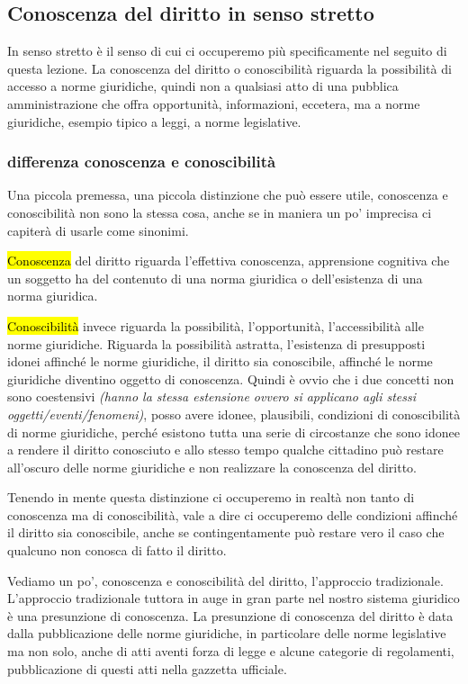 \subsection{Conoscenza del diritto in senso stretto}
In senso stretto è il senso di cui ci occuperemo più specificamente nel seguito di questa lezione.
La conoscenza del diritto o conoscibilità riguarda la possibilità di accesso a norme giuridiche, quindi non a qualsiasi atto di una pubblica amministrazione che offra opportunità, informazioni, eccetera, ma a norme giuridiche, esempio tipico a leggi, a norme legislative.\par 
\subsubsection{differenza conoscenza e conoscibilità}
Una piccola premessa, una piccola distinzione che può essere utile, conoscenza e conoscibilità non sono la stessa cosa, anche se in maniera un po' imprecisa ci capiterà di usarle come sinonimi.\par 
\hl{Conoscenza} del diritto riguarda l'effettiva conoscenza, apprensione cognitiva che un soggetto ha del contenuto di una norma giuridica o dell'esistenza di una norma giuridica. \par
\hl{Conoscibilità} invece riguarda la possibilità, l'opportunità, l'accessibilità alle norme giuridiche. Riguarda la possibilità astratta, l'esistenza di presupposti idonei affinché le norme giuridiche, il diritto sia conoscibile, affinché le norme giuridiche diventino oggetto di conoscenza. Quindi è ovvio che i due concetti non sono coestensivi \textit{(hanno la stessa estensione ovvero si applicano agli stessi oggetti/eventi/fenomeni)}, posso avere idonee, plausibili, condizioni di conoscibilità di norme giuridiche, perché esistono tutta una serie di circostanze che sono idonee a rendere il diritto conosciuto e allo stesso tempo qualche cittadino può restare all'oscuro delle norme giuridiche e non realizzare la conoscenza del diritto.\par
Tenendo in mente questa distinzione ci occuperemo in realtà non tanto di conoscenza ma di conoscibilità, vale a dire ci occuperemo delle condizioni affinché il diritto sia conoscibile, anche se contingentamente può restare vero il caso che qualcuno non conosca di fatto il diritto. \par
Vediamo un po', conoscenza e conoscibilità del diritto, l'approccio tradizionale. L'approccio tradizionale tuttora in auge in gran parte nel nostro sistema giuridico è una presunzione di conoscenza. La presunzione di conoscenza del diritto è data dalla pubblicazione delle norme giuridiche, in particolare delle norme legislative ma non solo, anche di atti aventi forza di legge e alcune categorie di regolamenti, pubblicazione di questi atti nella gazzetta ufficiale. 
